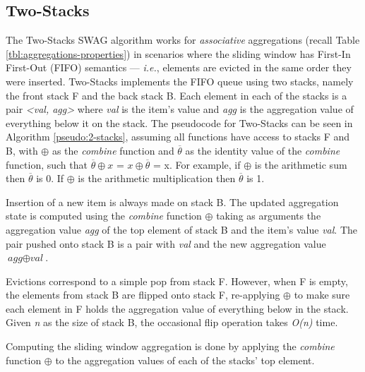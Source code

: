 \subsection{Two-Stacks} \label{sec:2stacks}
The Two-Stacks SWAG algorithm works for \textit{associative} aggregations (recall Table \ref{tbl:aggregations-properties}) in scenarios where the sliding window has First-In First-Out (FIFO) semantics --- \textit{i.e.}, elements are evicted in the same order they were inserted. Two-Stacks \cite{Tangwongsan-DABA} implements the FIFO queue using two stacks, namely the front stack F and the back stack B. Each element in each of the stacks is a pair \textit{<val, agg>} where \textit{val} is the item's value and \textit{agg} is the aggregation value of everything below it on the stack. The pseudocode for Two-Stacks can be seen in Algorithm \ref{pseudo:2-stacks}, assuming all functions have access to stacks F and B, with $\oplus$ as the \textit{combine} function and $\overline{\theta}$ as the identity value of the \textit{combine} function, such that $\overline{\theta} \oplus x$ = $x \oplus \overline{\theta}$ = x. For example, if $\oplus$ is the arithmetic sum then $\overline{\theta}$ is 0. If $\oplus$ is the arithmetic multiplication then $\overline{\theta}$ is 1.

Insertion of a new item is always made on stack B. The updated aggregation state is computed using the \textit{combine} function $\oplus$ taking as arguments the aggregation value \textit{agg} of the top element of stack B and the item's value \textit{val}. The pair pushed onto stack B is a pair with \textit{val} and the new aggregation value $\textit{agg} \oplus \textit{val}$.

Evictions correspond to a simple pop from stack F. However, when F is empty, the elements from stack B are flipped onto stack F, re-applying $\oplus$ to make sure each element in F holds the aggregation value of everything below in the stack. Given \textit{n} as the size of stack B, the occasional flip operation takes \textit{O(n)} time.

Computing the sliding window aggregation is done by applying the \textit{combine} function $\oplus$ to the aggregation values of each of the stacks' top element. 

